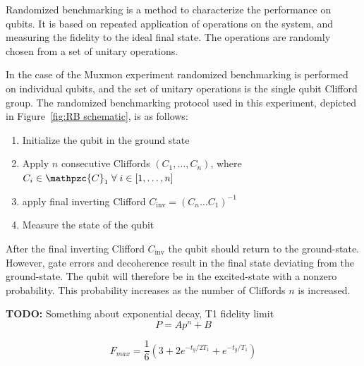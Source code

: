       Randomized benchmarking is a method to characterize the performance on qubits. It is based on repeated application of operations on the system, and measuring the fidelity to the ideal final state. The operations are randomly chosen from a set of unitary operations.

      In the case of the Muxmon experiment randomized benchmarking is performed on individual qubits, and the set of unitary operations is the single qubit Clifford group. The randomized benchmarking protocol used in this experiment, depicted in Figure~\ref{fig:RB schematic}, is as follows:

      \begin{enumerate}
        \item Initialize the qubit in the ground state
        \item Apply $n$ consecutive Cliffords $\left(C_1, \dots, C_n\right)$, where $C_i \in \mathpzc{C}_1 \; \forall \; i \in \left[1, \dots, n\right]$
        \item apply final inverting Clifford $C_\text{inv}=\left( C_n \dots C_1 \right)^{-1}$
        \item Measure the state of the qubit
      \end{enumerate}

      After the final inverting Clifford $C_\text{inv}$ the qubit should return to the ground-state. However, gate errors and decoherence result in the final state deviating from the ground-state. The qubit will therefore be in the excited-state with a nonzero probability. This probability increases as the number of Cliffords $n$ is increased.

      \textbf{TODO:} Something about exponential decay, T1 fidelity limit
      \begin{equation}
        P= A p^n + B
        \label{eq:RB exponential decay}
      \end{equation}

      \begin{equation}
        F_{max} = \frac{1}{6}\left(3 + 2 e^{-t_g/2 T_1} + e^{-t_g/T_1}\right)
        \label{eq:RB T1 fidelity limit}
      \end{equation}

